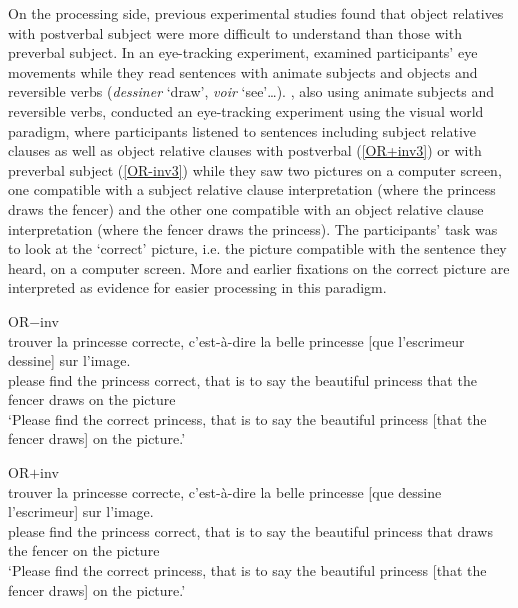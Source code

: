 \documentclass[output=paper]{langscibook}
\begin{document}
On the processing side, previous experimental studies found that
object relatives with postverbal subject were more difficult to
understand than those with preverbal subject. In an eye-tracking experiment,  \citet{Holmes1981}
examined participants' eye movements while they read sentences with animate
subjects and objects and reversible verbs (\textit{dessiner} ‘draw’,
\textit{voir} ‘see’…).  \citet{pozniak2015processing}, also using
animate subjects and reversible verbs, conducted an eye-tracking
experiment using the visual world paradigm, where participants listened to 
sentences including subject relative clauses as well as
object relative clauses with postverbal (\ref{OR+inv3}) or with
preverbal subject (\ref{OR-inv3}) while they saw two pictures on a
computer screen, one compatible with a subject relative clause
interpretation (where the princess draws the fencer) and the other one
compatible with an object relative clause interpretation (where the
fencer draws the princess). The participants’ task was to look at the
`correct' picture, i.e. the picture compatible with the sentence they
heard, on a computer screen. More and earlier fixations on the correct
picture are interpreted as evidence for easier processing in this
paradigm.


\begin{exe}
\ex OR$-$inv \label{OR-inv3}\\ 
 trouver la princesse correcte, c'est-à-dire la belle princesse [que l'escrimeur dessine] sur l'image. \\ please find the princess correct, {that is to say} the beautiful princess that {the fencer} draws on {the picture}
\\ 
\glt `Please find the correct princess, that is to say the beautiful princess [that the fencer draws] on the picture.'



\ex OR$+$inv \label{OR+inv3}\\ 
 trouver la princesse correcte, c'est-à-dire la belle princesse [que dessine l'escrimeur] sur l'image. \\   please find the princess correct, {that is to say} the beautiful princess that  draws {the fencer} on {the picture} 
\\ 
\glt `Please find the correct princess, that is to say the beautiful princess [that the fencer draws] on the picture.'

\end{exe}
\end{document}
